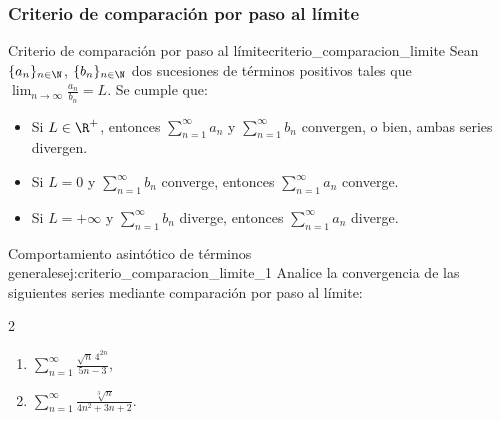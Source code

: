 \subsubsection{Criterio de comparación por paso al límite}

\begin{theorem}{Criterio de comparación por paso al límite}{criterio_comparacion_limite}
    Sean $\{ a_{n} \}_{n \in \N}$, $\{ b_{n} \}_{n \in \N}$ dos sucesiones de términos positivos tales que $\displaystyle \lim_{n \to \infty} \frac{a_n}{b_n} = L$. Se cumple que:
    \begin{itemize}
        \item Si $L \in \R^{+}$, entonces $\displaystyle \sum_{n=1}^{\infty}a_{n}$ y $\displaystyle \sum_{n=1}^{\infty}b_{n}$ convergen, o bien, ambas series divergen.
        \item Si $L = 0$ y $\displaystyle \sum_{n=1}^{\infty}b_{n}$ converge, entonces $\displaystyle \sum_{n=1}^{\infty}a_{n}$ converge.
        \item Si $L = +\infty$ y $\displaystyle \sum_{n=1}^{\infty}b_{n}$ diverge, entonces $\displaystyle \sum_{n=1}^{\infty}a_{n}$ diverge.
    \end{itemize}
\end{theorem}

\begin{example}{Comportamiento asintótico de términos generales}{ej:criterio_comparacion_limite_1}
    Analice la convergencia de las siguientes series mediante comparación por paso al límite:
    \begin{multicols}{2}
    \begin{enumerate}
        \item $\displaystyle \sum_{n=1}^{\infty}{\frac{\sqrt{n}\, 4^{2n}}{5n-3}}$,
        \item $\displaystyle \sum_{n=1}^{\infty}\frac{\sqrt[3]{n}}{4n^2 +3n+2}$.
    \end{enumerate}
    \end{multicols}
\end{example}


